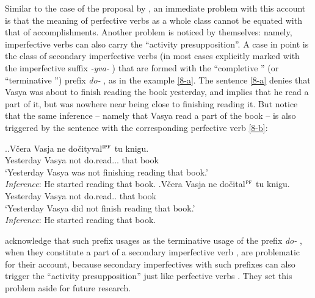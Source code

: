 Similar to the case of the proposal by \citet{Romanova:06}, an immediate problem with this account is that the meaning of perfective verbs  as a whole class cannot be equated with that of accomplishments. Another problem is noticed by \citet{Docekal:09} themselves: namely, imperfective verbs  can also carry the ``activity presupposition''. A case in point is the class of secondary imperfective  verbs  (in most cases explicitly marked with the imperfective suffix   \textit{-yva-}  ) that are formed with the ``completive '' (or ``terminative '') prefix \textit{do-}  , as in the example \ref{8-a}. The sentence \ref{8-a} denies that Vasya was about to finish reading the book yesterday, and implies that he read a part of it, but was nowhere near being close to finishing reading it. But notice that the same inference -- namely that Vasya read a part of the book -- is also triggered by the sentence with the corresponding perfective verb  \ref{8-b}:

\ex.\label{8}\ag.\label{8-a}V\v{c}era Vasja ne do\v{c}ityval$^{\textsc{ipf}}$ tu knigu.\\
Yesterday Vasya not do.read... that book\\
\trans `Yesterday Vasya was not finishing reading that book.'\\
\textit{Inference}: He started reading that book.
\bg.\label{8-b}V\v{c}era Vasja ne do\v{c}ital$^{\textsc{pf}}$ tu knigu.\\
Yesterday Vasya not do.read.. that book\\
\trans `Yesterday Vasya did not finish reading that book.'\\
\textit{Inference}: He started reading that book.

\citet{Docekal:09} acknowledge that such prefix usages as the terminative  usage of the prefix \textit{do-}  , when they constitute a part of a secondary imperfective  verb , are problematic for their account, because secondary imperfectives  with such prefixes can also trigger the ``activity presupposition'' just like perfective verbs . They set this problem aside for future  research. 

